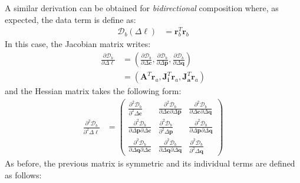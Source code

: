 A similar derivation can be obtained for \emph{bidirectional} composition where, as expected, the data term is define as:
\begin{equation}
    \begin{aligned}
		\mathcal{D}_b(\Delta \boldsymbol{\ell}) & = \mathbf{r}_b^T \mathbf{r}_b
    \label{eq:bidirectional_data}
    \end{aligned}
\end{equation}
In this case, the Jacobian matrix writes:
\begin{equation}
    \begin{aligned}
		\frac{\partial \mathcal{D}_b}{\partial \Delta \boldsymbol{\ell}} & = \left( \frac{\partial \mathcal{D}_b}{\partial \Delta \mathbf{c}}, \frac{\partial \mathcal{D}_b}{\partial \Delta \mathbf{p}}, \frac{\partial \mathcal{D}_b}{\partial \Delta \mathbf{q}} \right)
		\\
		& = \left( \mathbf{A}^T \mathbf{r}_a, \mathbf{J}_{\mathbf{i}}^T \mathbf{r}_a, \mathbf{J}_{\mathbf{a}}^T \mathbf{r}_a \right)
    \label{eq:bidirectional_newton_jacobian}
    \end{aligned}
\end{equation}
and the Hessian matrix takes the following form: 
\begin{equation}
    \begin{aligned}
		\frac{\partial^2 \mathcal{D}_b}{\partial^2 \Delta \boldsymbol{\ell}} & = 
		\begin{pmatrix}
			\frac{\partial^2 \mathcal{D}_b}{\partial^2 \Delta \mathbf{c}} & \frac{\partial^2 \mathcal{D}_b}{\partial \Delta \mathbf{c} \partial \Delta \mathbf{p}} & \frac{\partial^2 \mathcal{D}_b}{\partial \Delta \mathbf{c} \partial \Delta \mathbf{q}}
			\\
			\frac{\partial^2 \mathcal{D}_b}{\partial \Delta \mathbf{p} \partial \Delta \mathbf{c}} & \frac{\partial^2 \mathcal{D}_b}{\partial^2 \Delta \mathbf{p}} & \frac{\partial^2 \mathcal{D}_b}{\partial \Delta \mathbf{p} \partial \Delta \mathbf{q}}
			\\
			\frac{\partial^2 \mathcal{D}_b}{\partial \Delta \mathbf{q} \partial \Delta \mathbf{c}} & \frac{\partial^2 \mathcal{D}_b}{\partial \Delta \mathbf{q} \partial \Delta \mathbf{q}}
			& \frac{\partial^2 \mathcal{D}_b}{\partial^2 \Delta \mathbf{q}}
		\end{pmatrix}
    \label{eq:bidirectional_newton_hessian}
    \end{aligned}
\end{equation}
As before, the previous matrix is symmetric and its individual terms are defined as follows:
